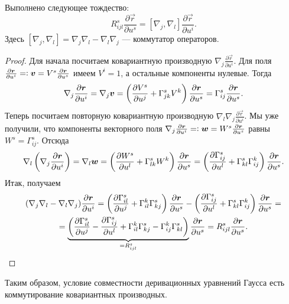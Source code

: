 \begin{lemma}
	Выполнено следующее тождество:
	\[
		R^s_{ijl}\frac{\partial\vec{r}}{\partial u^s} = [\nabla_j, \nabla_l]\frac{\partial\vec{r}}{\partial u^i}.
	\]
	Здесь $[\nabla_j, \nabla_l] = \nabla_j\nabla_l - \nabla_l\nabla_j$ --- коммутатор операторов.
\end{lemma}

\begin{proof}
	Для начала посчитаем ковариантную производную $\nabla_j\frac{\partial\vec{r}}{\partial u^i}$. Для поля $\frac{\partial\vec{r}}{\partial u^i} = \vcentcolon \vec{v} = V^s\frac{\partial\vec{r}}{\partial u^s}$ имеем $V^i = 1$, а остальные компоненты нулевые. Тогда
	\[
		\nabla_j\frac{\partial \vec{r}}{\partial u^i} = \nabla_j\vec{v} = \br{\frac{\partial V^s}{\partial u^j} + \Gamma_{jk}^sV^k}\frac{\partial\vec{r}}{\partial u^s} = \Gamma_{ij}^s\frac{\partial\vec{r}}{\partial u^s}.
	\]
	Теперь посчитаем повторную ковариантную производную $\nabla_l\nabla_j\frac{\partial\vec{r}}{\partial u^i}$. Мы уже получили, что компоненты векторного поля $\nabla_j\frac{\partial\vec{r}}{\partial u^i} = \vcentcolon \vec{w} = W^s\frac{\partial\vec{r}}{\partial u^s}$ равны $W^s = \Gamma_{ij}^s$. Отсюда
	\[
		\nabla_l\br{\nabla_j\frac{\partial\vec{r}}{\partial u^i}} = \nabla_l\vec{w} = \br{\frac{\partial W^s}{\partial u^l} + \Gamma_{lk}^sW^k}\frac{\partial\vec{r}}{\partial u^s} = \br{\frac{\partial\Gamma_{ij}^s}{\partial u^l} + \Gamma_{kl}^s\Gamma_{ij}^k}\frac{\partial\vec{r}}{\partial u^s}.
	\]
	Итак, получаем
	\begin{multline*}
		(\nabla_j\nabla_l - \nabla_l\nabla_j)\frac{\partial\vec{r}}{\partial u^i} = \br{\frac{\partial\Gamma_{il}^s}{\partial u^j} + \Gamma_{il}^k\Gamma_{kj}^s}\frac{\partial\vec{r}}{\partial u^s} - \br{\frac{\partial\Gamma_{ij}^s}{\partial u^l} + \Gamma_{kl}^s\Gamma_{ij}^k}\frac{\partial\vec{r}}{\partial u^s} =\\ = \underbrace{\br{\frac{\partial\Gamma_{il}^s}{\partial u^j} - \frac{\partial\Gamma_{ij}^s}{\partial u^l} + \Gamma_{il}^k\Gamma_{kj}^s - \Gamma_{ij}^k\Gamma_{kl}^s}}_{= R^s_{ijl}}\frac{\partial\vec{r}}{\partial u^s} = R^s_{ijl}\frac{\partial\vec{r}}{\partial u^s}.
	\end{multline*}
\end{proof}

Таким образом, условие совместности деривационных уравнений Гаусса есть коммутирование ковариантных производных.

